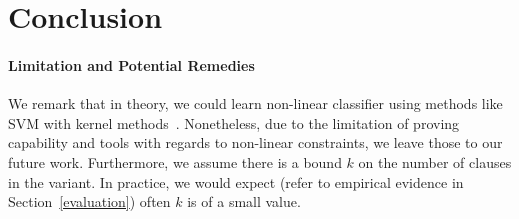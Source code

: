 
\section{Conclusion} \label{conclusion}


\paragraph{Limitation and Potential Remedies}
We remark that in theory, we could learn non-linear classifier using methods like SVM with kernel methods~\cite{}. 
Nonetheless, due to the limitation of proving capability and tools with regards to non-linear constraints, we leave those to our future work. 
Furthermore, we assume there is a bound $k$ on the number of clauses in the variant. 
In practice, we would expect (refer to empirical evidence in Section~\ref{evaluation}) often $k$ is of a small value.
